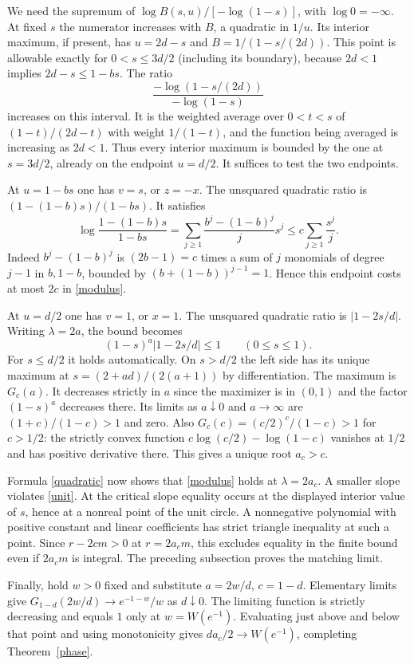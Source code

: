 \documentclass[11pt]{article}
\begin{document}
We need the supremum of $\log B(s,u)/[-\log(1-s)]$, with $\log 0=-\infty$. At fixed $s$ the numerator increases with $B$, a quadratic in $1/u$. Its interior maximum, if present, has $u=2d-s$ and $B=1/(1-s/(2d))$. This point is allowable exactly for $0<s\le 3d/2$ (including its boundary), because $2d<1$ implies $2d-s\le 1-bs$. The ratio
\[
 \frac{-\log(1-s/(2d))}{-\log(1-s)}
\]
increases on this interval. It is the weighted average over $0<t<s$ of $(1-t)/(2d-t)$ with weight $1/(1-t)$, and the function being averaged is increasing as $2d<1$. Thus every interior maximum is bounded by the one at $s=3d/2$, already on the endpoint $u=d/2$. It suffices to test the two endpoints.

At $u=1-bs$ one has $v=s$, or $z=-x$. The unsquared quadratic ratio is $(1-(1-b)s)/(1-bs)$. It satisfies
\[
 \log\frac{1-(1-b)s}{1-bs}
  =\sum_{j\ge1}\frac{b^j-(1-b)^j}{j}s^j
  \le c\sum_{j\ge1}\frac{s^j}j.
\]
Indeed $b^j-(1-b)^j$ is $(2b-1)=c$ times a sum of $j$ monomials of degree $j-1$ in $b,1-b$, bounded by $(b+(1-b))^{j-1}=1$. Hence this endpoint costs at most $2c$ in \eqref{modulus}.

At $u=d/2$ one has $v=1$, or $x=1$. The unsquared quadratic ratio is $|1-2s/d|$. Writing $\lambda=2a$, the bound becomes
\begin{equation}\label{unit}
   (1-s)^a |1-2s/d|\le1\qquad (0\le s\le1).
\end{equation}
For $s\le d/2$ it holds automatically. On $s>d/2$ the left side has its unique maximum at $s=(2+ad)/(2(a+1))$ by differentiation. The maximum is $G_c(a)$. It decreases strictly in $a$ since the maximizer is in $(0,1)$ and the factor $(1-s)^a$ decreases there. Its limits as $a\downarrow0$ and $a\to\infty$ are $(1+c)/(1-c)>1$ and zero. Also $G_c(c)=(c/2)^c/(1-c)>1$ for $c>1/2$: the strictly convex function $c\log(c/2)-\log(1-c)$ vanishes at $1/2$ and has positive derivative there. This gives a unique root $a_c>c$.

Formula \eqref{quadratic} now shows that \eqref{modulus} holds at $\lambda=2a_c$. A smaller slope violates \eqref{unit}. At the critical slope equality occurs at the displayed interior value of $s$, hence at a nonreal point of the unit circle. A nonnegative polynomial with positive constant and linear coefficients has strict triangle inequality at such a point. Since $r-2cm>0$ at $r=2a_cm$, this excludes equality in the finite bound even if $2a_cm$ is integral. The preceding subsection proves the matching limit.

Finally, hold $w>0$ fixed and substitute $a=2w/d$, $c=1-d$. Elementary limits give $G_{1-d}(2w/d)\to e^{-1-w}/w$ as $d\downarrow0$. The limiting function is strictly decreasing and equals $1$ only at $w=W(e^{-1})$. Evaluating just above and below that point and using monotonicity gives $da_c/2\to W(e^{-1})$, completing Theorem~\ref{phase}.
\end{document}
